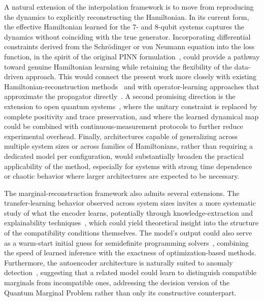 A natural extension of the interpolation framework is to move from reproducing the dynamics to explicitly reconstructing the Hamiltonian. In its current form, the effective Hamiltonian learned for the 7- and 8-qubit systems captures the dynamics without coinciding with the true generator. Incorporating differential constraints derived from the Schrödinger or von Neumann equation into the loss function, in the spirit of the original PINN formulation~\cite{Raissi2019}, could provide a pathway toward genuine Hamiltonian learning while retaining the flexibility of the data-driven approach. This would connect the present work more closely with existing Hamiltonian-reconstruction methods~\cite{che_2021, han_2021, franceschetto2025} and with operator-learning approaches that approximate the propagator directly~\cite{shah2025machine, wang2023machine}. A second promising direction is the extension to open quantum systems~\cite{BreuerPetruccione2006}, where the unitary constraint is replaced by complete positivity and trace preservation, and where the learned dynamical map could be combined with continuous-measurement protocols to further reduce experimental overhead. Finally, architectures capable of generalizing across multiple system sizes or across families of Hamiltonians, rather than requiring a dedicated model per configuration, would substantially broaden the practical applicability of the method, especially for systems with strong time dependence or chaotic behavior where larger architectures are expected to be necessary.

The marginal-reconstruction framework also admits several extensions. The transfer-learning behavior observed across system sizes invites a more systematic study of what the encoder learns, potentially through knowledge-extraction and explainability techniques~\cite{odense2020}, which could yield theoretical insight into the structure of the compatibility conditions themselves. The model's output could also serve as a warm-start initial guess for semidefinite programming solvers~\cite{angell2024, skrzypczyk2023sdp}, combining the speed of learned inference with the exactness of optimization-based methods. Furthermore, the autoencoder architecture is naturally suited to anomaly detection~\cite{islam2020}, suggesting that a related model could learn to distinguish compatible marginals from incompatible ones, addressing the decision version of the Quantum Marginal Problem rather than only its constructive counterpart.

